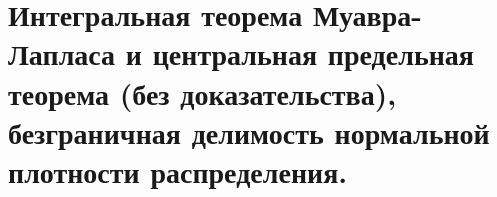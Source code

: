 \documentclass[polytech/stats/exam-2023/stats-exam-2023.tex]{subfiles}
\begin{document}
\section{Интегральная теорема Муавра-Лапласа и центральная предельная теорема (без доказательства), безграничная делимость нормальной плотности распределения.}
\end{document}
